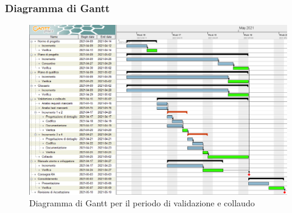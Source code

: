 \subsubsection{Diagramma di Gantt}

\begin{figure}[H]
\centering

\centerline{\includegraphics[scale=0.6]{res/Pianificazione/Gantt/verifica}}
\caption{Diagramma di Gantt per il periodo di validazione e collaudo}
\end{figure}